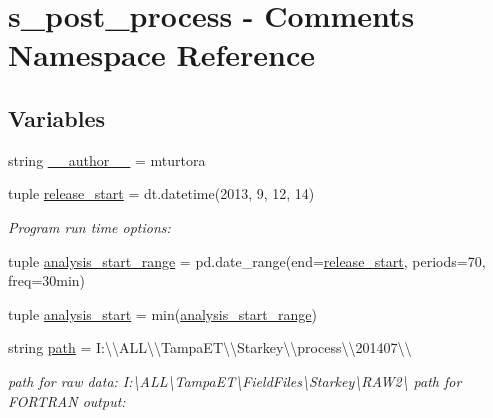 \hypertarget{namespaces__post__process_01-_01_comments}{}\section{s\+\_\+post\+\_\+process -\/ Comments Namespace Reference}
\label{namespaces__post__process_01-_01_comments}
\subsection*{Variables}
\begin{DoxyCompactItemize}
\item 
string \hyperlink{namespaces__post__process_01-_01_comments_aa93abb3c2ba5b38151b6fae9743987e1}{\+\_\+\+\_\+author\+\_\+\+\_\+} = \textquotesingle{}mturtora\textquotesingle{}
\item 
tuple \hyperlink{namespaces__post__process_01-_01_comments_a76368c115dbbbd72360ddbd4ec4a9a04}{release\+\_\+start} = dt.\+datetime(2013, 9, 12, 14)
\begin{DoxyCompactList}\small\item\em Program run time options\+: \end{DoxyCompactList}\item 
tuple \hyperlink{namespaces__post__process_01-_01_comments_a52f70ed51d091a8626e86e98b3375f39}{analysis\+\_\+start\+\_\+range} = pd.\+date\+\_\+range(end=\hyperlink{namespaces__post__process_01-_01_comments_a76368c115dbbbd72360ddbd4ec4a9a04}{release\+\_\+start}, periods=70, freq=\textquotesingle{}30min\textquotesingle{})
\item 
tuple \hyperlink{namespaces__post__process_01-_01_comments_a9323e6fee869aa9c51bc49305dcb973d}{analysis\+\_\+start} = min(\hyperlink{namespaces__post__process_01-_01_comments_a52f70ed51d091a8626e86e98b3375f39}{analysis\+\_\+start\+\_\+range})
\item 
string \hyperlink{namespaces__post__process_01-_01_comments_a443ac998e99f88439a5522c68a86609f}{path} = \textquotesingle{}I\+:\textbackslash{}\textbackslash{}\+A\+L\+L\textbackslash{}\textbackslash{}\+Tampa\+E\+T\textbackslash{}\textbackslash{}\+Starkey\textbackslash{}\textbackslash{}process\textbackslash{}\textbackslash{}201407\textbackslash{}\textbackslash{}\textquotesingle{}
\begin{DoxyCompactList}\small\item\em path for raw data\+: \textquotesingle{}I\+:\textbackslash{}A\+L\+L\textbackslash{}Tampa\+E\+T\textbackslash{}Field\+Files\textbackslash{}Starkey\textbackslash{}R\+A\+W2\textbackslash{}\textquotesingle{} path for F\+O\+R\+T\+R\+A\+N output\+: \end{DoxyCompactList}\item 

\end{DoxyCompactItemize}
